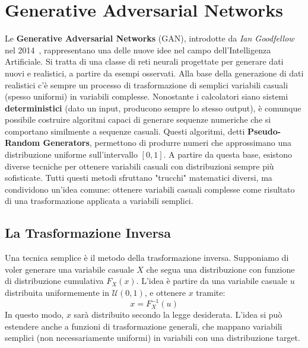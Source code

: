 \chapter{Generative Adversarial Networks}

Le \textbf{Generative Adversarial Networks} (GAN), introdotte da \textit{Ian Goodfellow} nel 2014~\cite{goodfellow2014generative}, rappresentano una delle nuove idee nel campo dell’Intelligenza Artificiale. Si tratta di una classe di reti neurali progettate per generare dati nuovi e realistici, a partire da esempi osservati. Alla base della generazione di dati realistici c’è sempre un processo di trasformazione di semplici variabili casuali (spesso uniformi) in variabili complesse. Nonostante i calcolatori siano sistemi \textbf{deterministici} (dato un input, producono sempre lo stesso output), è comunque possibile costruire algoritmi capaci di generare sequenze numeriche che si comportano similmente a sequenze casuali. Questi algoritmi, detti \textbf{Pseudo-Random Generators}, permettono di produrre numeri che approssimano una distribuzione uniforme sull’intervallo $[0,1]$. A partire da questa base, esistono diverse tecniche per ottenere variabili casuali con distribuzioni sempre più sofisticate. Tutti questi metodi sfruttano "trucchi" matematici diversi, ma condividono un'idea comune: ottenere variabili casuali complesse come risultato di una trasformazione applicata a variabili semplici.

\section{La Trasformazione Inversa}

Una tecnica semplice è il metodo della trasformazione inversa. Supponiamo di voler generare una variabile casuale $X$ che segua una distribuzione con funzione di distribuzione cumulativa $F_X(x)$. L’idea è partire da una variabile casuale $u$ distribuita uniformemente in $\mathcal{U}(0,1)$, e ottenere $x$ tramite:
\begin{equation}
    x = F_X^{-1}(u)
\end{equation}
In questo modo, $x$ sarà distribuito secondo la legge desiderata. L’idea si può estendere anche a funzioni di trasformazione generali, che mappano variabili semplici (non necessariamente uniformi) in variabili con una distribuzione target.

